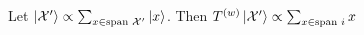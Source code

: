 \documentclass[manuscript,screen,review]{acmart}
\begin{document}
\begin{claim}
  Let $\ket{\mathcal{X}^\prime} \propto \sum_{x \in \text{span } \mathcal{X}^\prime }{\ket{x}}$. Then $T^{(w)}\ket{\mathcal{X}^\prime} \propto \sum_{x \in \text{span }i}{  x  }$
\end{claim}





%

\printbibliography
\end{document}
